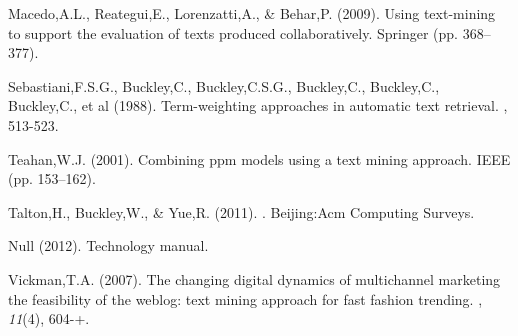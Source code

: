 \begin{thebibliography}{}
Macedo,A.L., Reategui,E., Lorenzatti,A., \& Behar,P. (2009).
\newblock Using text-mining to support the evaluation of texts produced collaboratively. Springer (pp. 368--377).

Sebastiani,F.S.G., Buckley,C., Buckley,C.S.G., Buckley,C., Buckley,C., Buckley,C., et al (1988).
\newblock Term-weighting approaches in automatic text retrieval.
, 513-523.

Teahan,W.J. (2001).
\newblock Combining ppm models using a text mining approach. IEEE (pp. 153--162).

Talton,H., Buckley,W., \& Yue,R. (2011).
. Beijing:Acm Computing Surveys.

Null (2012).
\newblock Technology manual.

Vickman,T.A. (2007).
\newblock The changing digital dynamics of multichannel marketing the feasibility of the weblog: text mining approach for fast fashion trending.
, {\em 11}(4), 604-+.

\end{thebibliography}
    